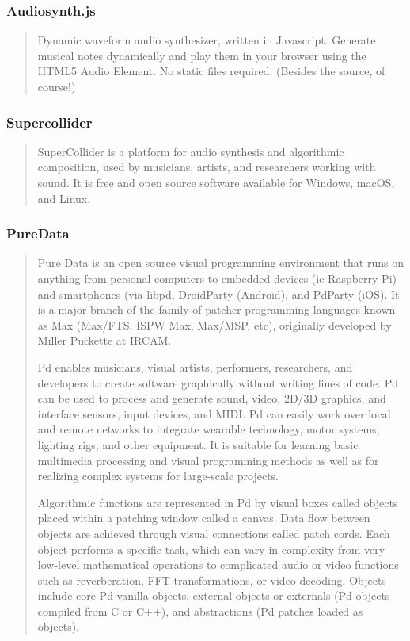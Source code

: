 \documentclass[12pt,a4paper]{article}
\begin{document}
\subsubsection{Audiosynth.js}

\begin{quote}
Dynamic waveform audio synthesizer, written in Javascript. Generate musical notes dynamically and play them in your browser using the HTML5 Audio Element. No static files required. (Besides the source, of course!) \cite{audiosynth}
\end{quote}

\subsubsection{Supercollider}

\begin{quote}
SuperCollider is a platform for audio synthesis and algorithmic composition, used by musicians, artists, and researchers working with sound. It is free and open source software available for Windows, macOS, and Linux. \cite{supercollider}
\end{quote}

\subsubsection{PureData}

\begin{quote}
Pure Data is an open source visual programming environment that runs on anything from personal computers to embedded devices (ie Raspberry Pi) and smartphones (via libpd, DroidParty (Android), and PdParty (iOS). It is a major branch of the family of patcher programming languages known as Max (Max/FTS, ISPW Max, Max/MSP, etc), originally developed by Miller Puckette at IRCAM.

Pd enables musicians, visual artists, performers, researchers, and developers to create software graphically without writing lines of code. Pd can be used to process and generate sound, video, 2D/3D graphics, and interface sensors, input devices, and MIDI. Pd can easily work over local and remote networks to integrate wearable technology, motor systems, lighting rigs, and other equipment. It is suitable for learning basic multimedia processing and visual programming methods as well as for realizing complex systems for large-scale projects.

Algorithmic functions are represented in Pd by visual boxes called objects placed within a patching window called a canvas. Data flow between objects are achieved through visual connections called patch cords. Each object performs a specific task, which can vary in complexity from very low-level mathematical operations to complicated audio or video functions such as reverberation, FFT transformations, or video decoding. Objects include core Pd vanilla objects, external objects or externals (Pd objects compiled from C or C++), and abstractions (Pd patches loaded as objects). \cite{puredata}
\end{quote}
\end{document}

